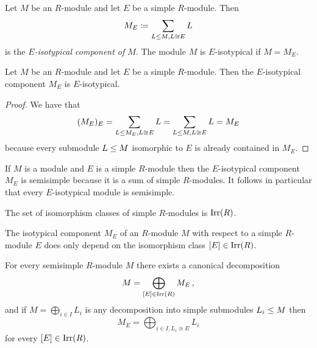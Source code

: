 \begin{definition}
  Let $M$ be an $R$-module and let $E$ be a simple $R$-module.
  Then
  \[
              M_E
    \coloneqq  \sum_{L \leq M, L \cong E} L
  \]
  is the \emph{$E$-isotypical component of $M$}.
  The module $M$ is $E$-isotypical if $M = M_E$.
\end{definition}


\begin{lemma}
  Let $M$ be an $R$-module and let $E$ be a simple $R$-module.
  Then the $E$-isotypical component $M_E$ is $E$-isotypical.
\end{lemma}


\begin{proof}
  We have that
  \[
      (M_E)_E
    = \sum_{L \leq M_E, L \cong E} L
    = \sum_{L \leq M, L \cong E} L
    = M_E
  \]
  because every submodule $L \leq M$ isomorphic to $E$ is already contained in $M_E$.
\end{proof}


\begin{remark}
  If $M$ is a module and $E$ is a simple $R$-module then the $E$-isotypical component $M_E$ is semisimple because it is a sum of simple $R$-modules.
  It follows in particular that every $E$-isotypical module is semisimple.
\end{remark}


\begin{definition}
  The set of isomorphism classes of simple $R$-modules is $\operatorname{Irr}(R)$.
\end{definition}


\begin{remark}
  The isotypical component $M_E$ of an $R$-module $M$ with respect to a simple $R$-module $E$ does only depend on the isomorphism class $[E] \in \operatorname{Irr}(R)$.
\end{remark}


\begin{theorem}
  \label{corollary: canonical decomposition semisimple module}
  For every semisimple $R$-module $M$ there exists a canonical decomposition
  \[
      M
    = \bigoplus_{[E] \in \operatorname{Irr}(R)} M_E \,,
  \]
  and if $M = \bigoplus_{i \in I} L_i$ is any decomposition into simple submodules $L_i \leq M$ then
  \[
      M_E
    = \bigoplus_{i \in I, L_i \cong E} L_i
  \]
  for every $[E] \in \operatorname{Irr}(R)$.
\end{theorem}


